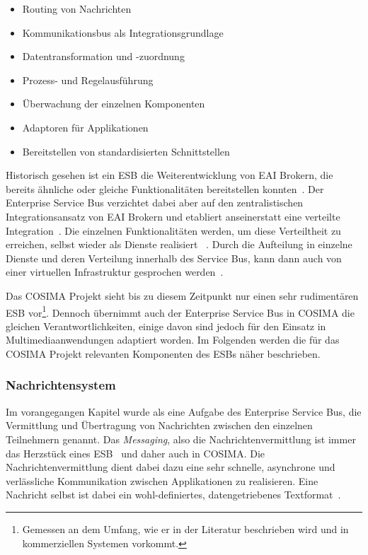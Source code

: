   \begin{itemize}
    \item Routing von Nachrichten
    \item Kommunikationsbus als Integrationsgrundlage
    \item Datentransformation und -zuordnung
    \item Prozess- und Regelausführung
    \item Überwachung der einzelnen Komponenten
    \item Adaptoren für Applikationen
    \item Bereitstellen von standardisierten Schnittstellen
  \end{itemize}

  Historisch gesehen ist ein ESB die Weiterentwicklung von EAI Brokern, die bereits ähnliche oder gleiche Funktionalitäten bereitstellen konnten~\citep[S. 146]{masak2007ssb}. Der Enterprise Service Bus verzichtet dabei aber auf den zentralistischen Integrationsansatz von EAI Brokern und etabliert anseinerstatt eine verteilte Integration~\citep[S. 4]{enterprise_service_bus}. Die einzelnen Funktionalitäten werden, um diese Verteiltheit zu erreichen, selbst wieder als Dienste realisiert ~\citep{enterprise_service_bus,masak2007ssb,papazoglou2007soc}. Durch die Aufteilung in einzelne Dienste und deren Verteilung innerhalb des Service Bus, kann dann auch von einer virtuellen Infrastruktur gesprochen werden~\citep[S. 136]{soa_goes_real}.
  
  Das COSIMA Projekt sieht bis zu diesem Zeitpunkt nur einen sehr rudimentären ESB vor\footnote{Gemessen an dem Umfang, wie er in der Literatur beschrieben wird und in kommerziellen Systemen vorkommt.}. Dennoch übernimmt auch der Enterprise Service Bus in COSIMA die gleichen Verantwortlichkeiten, einige davon sind jedoch für den Einsatz in Multimediaanwendungen adaptiert worden. Im Folgenden werden die für das COSIMA Projekt relevanten Komponenten des ESBs näher beschrieben.
  
\subsubsection{Nachrichtensystem} %
\label{ssub:nachrichtensystem}
  
  Im vorangegangen Kapitel wurde als eine Aufgabe des Enterprise Service Bus, die Vermittlung und Übertragung von Nachrichten zwischen den einzelnen Teilnehmern genannt. Das \emph{Messaging}, also die Nachrichtenvermittlung ist immer das Herzstück eines ESB~\citep[S. 77]{enterprise_service_bus} und daher auch in COSIMA. Die Nachrichtenvermittlung dient dabei dazu eine sehr schnelle, asynchrone und verlässliche Kommunikation zwischen Applikationen zu realisieren. Eine Nachricht selbst ist dabei ein wohl-definiertes, datengetriebenes Textformat~\citep[S. 60f]{web_services_principles_and_technology}.
  
